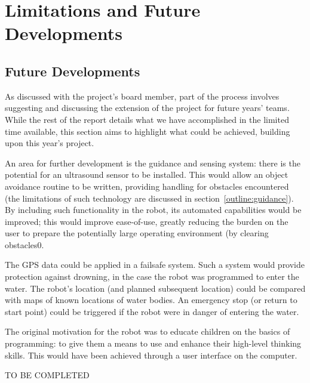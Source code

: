 \chapter{Limitations and Future Developments}\label{limitations}\label{futures}\label{section \thechapter}
\section{Future Developments}\label{Limitations and Future Developments: Future Developments}
As  discussed  with  the  project's  board  member,  part  of  the  process  involves  suggesting  and discussing  the  extension  of  the  project  for  future  years' teams.  While  the  rest  of  the  report  details what  we  have  accomplished  in  the  limited  time  available,  this  section  aims  to  highlight  what  could be achieved, building upon this year's project.

An  area  for  further  development is  the  guidance  and sensing  system:  there  is the  potential for an ultrasound sensor to be installed. This would allow an object avoidance routine to be written, providing  handling  for  obstacles  encountered  (the  limitations  of  such  technology  are  discussed  in section~\ref{outline:guidance}).  By  including  such functionality  in  the  robot,  its  automated  capabilities  would  be improved; this would improve ease-of-use, greatly reducing the burden on the user to prepare the potentially large operating environment (\ie by clearing obstacles0.

The \gls{GPS} data could be applied in a failsafe system. Such a system would provide protection against  drowning,  in the  case  the  robot  was  programmed  to  enter  the  water.  The  robot's  location (and  planned  subsequent  location)  could  be  compared  with  maps  of  known  locations  of  water bodies. An emergency stop (or return to start point) could be triggered if the robot were in danger of entering the water.

The original motivation for the robot was to educate children on the basics of programming: to  give  them  a  means  to  use  and  enhance  their  high-level  thinking skills.  This  would  have  been achieved through a user interface on the computer.

TO BE COMPLETED
